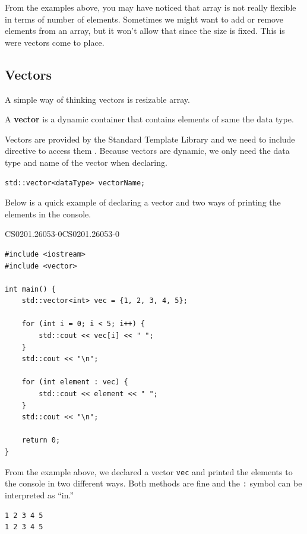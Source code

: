 \documentclass[../../../main.tex]{subfiles}
\begin{document}
From the examples above, you may have noticed that array is not
really flexible in terms of number of elements. Sometimes we
might want to add or remove elements from an array, but it won't
allow that since the size is fixed. This is were vectors come
to place.

\subsection{Vectors}

A simple way of thinking vectors is resizable array.

\begin{definition}{}{}
A \textbf{vector} is a dynamic container that contains elements of
same the data type.
\end{definition}

Vectors are provided by the Standard Template Library and we need
to include directive to access them \cite{CS02-5}. Because
vectors are dynamic, we only need the data type and name of the
vector when declaring.

\begin{outputbox}
\begin{lstlisting}[style=basic]
std::vector<dataType> vectorName;
\end{lstlisting}
\end{outputbox}

Below is a quick example of declaring a vector and two ways of
printing the elements in the console.

\begin{cppbox}{CS0201.26053-0}{CS0201.26053-0}
\begin{lstlisting}[style=cppstyle]
#include <iostream>
#include <vector>

int main() {
    std::vector<int> vec = {1, 2, 3, 4, 5};

    for (int i = 0; i < 5; i++) {
        std::cout << vec[i] << " ";
    }
    std::cout << "\n";

    for (int element : vec) {
        std::cout << element << " ";
    }
    std::cout << "\n";

    return 0;
}
\end{lstlisting}
\end{cppbox}

From the example above, we declared a vector \verb|vec| and printed
the elements to the console in two different ways. Both methods are
fine and the \verb|:| symbol can be interpreted as ``in.''

\begin{outputbox}
\begin{lstlisting}[style=basic]
1 2 3 4 5
1 2 3 4 5
\end{lstlisting}
\end{outputbox}
\end{document}
